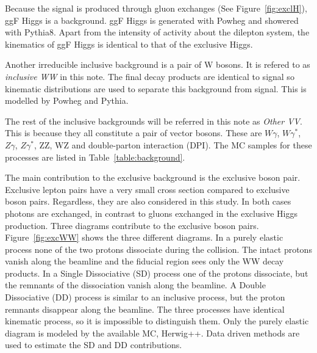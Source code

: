 \par Because the signal is produced through gluon exchanges (See  Figure~\ref{fig:exclH}), ggF Higgs
is a background. ggF Higgs is generated with Powheg and showered with Pythia8. Apart from the intensity 
of activity about the dilepton system, the kinematics of ggF Higgs is identical to that of 
the exclusive Higgs.

\par Another irreducible inclusive background is a pair of W bosons. It is refered to as 
{\it inclusive WW} in this note. The final decay products are identical to signal so 
kinematic distributions are used to separate this background from signal. This is modelled 
by Powheg and Pythia.

\par The rest of the inclusive backgrounds will be referred in this note as {\it Other VV}. This is because they
all constitute a pair of vector bosons. These are $W\gamma$, $W\gamma^*$, $Z\gamma$, $Z\gamma^*$, ZZ, WZ and 
double-parton interaction (DPI). The MC samples for these processes are listed in Table~\ref{table:background}. 
     
\par The main contribution to the exclusive background is the exclusive boson pair. 
Exclusive lepton pairs have a very small cross section compared to exclusive boson pairs. Regardless, 
they are also considered in this study. 
In both cases photons are exchanged, in contrast to gluons exchanged 
in the exclusive Higgs production.
Three diagrams contribute to the exclusive boson pairs. Figure~\ref{fig:excWW} shows the three different diagrams.
In a purely elastic process none of the two protons dissociate during the collision. The intact protons 
vanish along the beamline and the fiducial region sees only the WW decay products. In a Single Dissociative (SD) process
one of the protons dissociate, but the remnants of the dissociation 
vanish along the beamline. A Double Dissociative (DD) process is similar to an inclusive process, but the proton remnants disappear along the beamline.
The three processes have identical kinematic process, so it is impossible to 
distinguish them. Only the purely elastic diagram is modeled by the available MC, Herwig++. 
Data driven methods are used to estimate the SD and DD contributions.    

